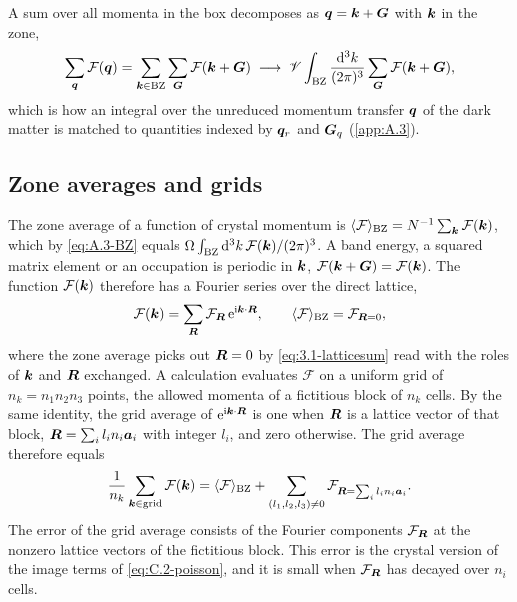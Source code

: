 A sum over all momenta in the box decomposes as $\bm{q} = \bm{k} + \bm{G}$ with $\bm{k}$ in the zone,
\begin{equation}
  \sum_{\bm{q}}\mathcal{F}(\bm{q}) = \sum_{\bm{k}\in\mathrm{BZ}}\sum_{\bm{G}}\mathcal{F}(\bm{k} + \bm{G})
  \;\longrightarrow\; \mathscr{V}\int_{\mathrm{BZ}}\frac{\mathrm{d}^3k}{(2\pi)^3}\sum_{\bm{G}}\mathcal{F}(\bm{k} + \bm{G}) ,
  \label{eq:C.2-unfold}
\end{equation}
which is how an integral over the unreduced momentum transfer $\bm{q}$ of the dark matter is matched to quantities indexed by $\bm{q}_r$ and $\bm{G}_q$ (\cref{app:A.3}).

\subsection{Zone averages and grids}

The zone average of a function of crystal momentum is $\langle \mathcal{F}\rangle_{\mathrm{BZ}} = N^{-1}\sum_{\bm{k}}\mathcal{F}(\bm{k})$, which by \cref{eq:A.3-BZ} equals $\Omega\int_{\mathrm{BZ}}\mathrm{d}^3k\,\mathcal{F}(\bm{k})/(2\pi)^3$. A band energy, a squared matrix element or an occupation is periodic in $\bm{k}$, $\mathcal{F}(\bm{k} + \bm{G}) = \mathcal{F}(\bm{k})$. The function $\mathcal{F}(\bm{k})$ therefore has a Fourier series over the direct lattice,
\begin{equation*}
  \mathcal{F}(\bm{k}) = \sum_{\bm{R}}\mathcal{F}_{\bm{R}}\,\mathrm{e}^{\mathrm{i}\bm{k}\cdot\bm{R}}, \qquad \langle \mathcal{F}\rangle_{\mathrm{BZ}} = \mathcal{F}_{\bm{R}=0} ,
\end{equation*}
where the zone average picks out $\bm{R} = 0$ by \cref{eq:3.1-latticesum} read with the roles of $\bm{k}$ and $\bm{R}$ exchanged. A calculation evaluates $\mathcal{F}$ on a uniform grid of $n_k = n_1n_2n_3$ points, the allowed momenta of a fictitious block of $n_k$ cells. By the same identity, the grid average of $\mathrm{e}^{\mathrm{i}\bm{k}\cdot\bm{R}}$ is one when $\bm{R}$ is a lattice vector of that block, $\bm{R} = \sum_i l_in_i\bm{a}_i$ with integer $l_i$, and zero otherwise. The grid average therefore equals
\begin{equation}
  \frac{1}{n_k}\sum_{\bm{k}\in\text{grid}}\mathcal{F}(\bm{k}) = \langle \mathcal{F}\rangle_{\mathrm{BZ}} + \sum_{(l_1,l_2,l_3)\neq0}\mathcal{F}_{\bm{R} = \sum_il_in_i\bm{a}_i} .
  \label{eq:C.2-grid}
\end{equation}
The error of the grid average consists of the Fourier components $\mathcal{F}_{\bm{R}}$ at the nonzero lattice vectors of the fictitious block. This error is the crystal version of the image terms of \cref{eq:C.2-poisson}, and it is small when $\mathcal{F}_{\bm{R}}$ has decayed over $n_i$ cells.

